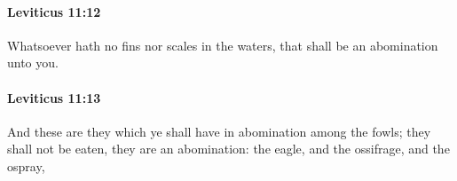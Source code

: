 		\paragraph{Leviticus 11:12} %
			\label{LEVITICUS-11-12}

			Whatsoever hath no fins nor scales in the waters, that shall be an abomination unto you.


		\paragraph{Leviticus 11:13} %
			\label{LEVITICUS-11-13}

			And these are they which ye shall have in abomination among the fowls; they shall not be eaten, they are an abomination: the eagle, and the ossifrage, and the ospray,


